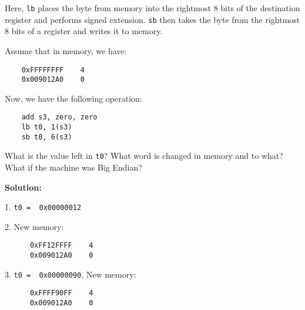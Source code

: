 Here, \verb|lb| places the byte from memory into the rightmost 8 bits of the destination register and performs signed extension. \verb|sb| then takes the byte from the rightmost 8 bits of a register and writes it to memory.

\begin{eg}
  Assume that in memory, we have:
  \begin{verbatim}
    0xFFFFFFFF    4
    0x009012A0    0
  \end{verbatim}

  Now, we have the following operation:

  \begin{verbatim}
    add s3, zero, zero
    lb t0, 1(s3)
    sb t0, 6(s3)
  \end{verbatim}
  
  What is the value left in \verb|t0|? What word is changed in memory and to what? What if the machine was Big Endian? 

  \textbf{Solution:} 

  1. \verb|t0 =  0x00000012|
  
  2. New memory:
    \begin{verbatim}
      0xFF12FFFF    4
      0x009012A0    0
    \end{verbatim}

  3. \verb|t0 =  0x00000090|, New memory:
    \begin{verbatim}
      0xFFFF90FF    4
      0x009012A0    0
    \end{verbatim}
\end{eg}